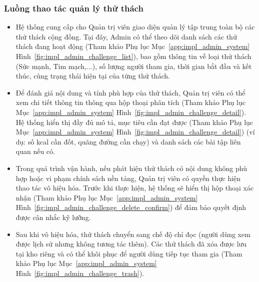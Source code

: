 \subsubsection{Luồng thao tác quản lý thử thách}
\begin{itemize}
    \item Hệ thống cung cấp cho Quản trị viên giao diện quản lý tập trung toàn bộ các thử thách cộng đồng. Tại đây, Admin có thể theo dõi danh sách các thử thách đang hoạt động (Tham khảo Phụ lục Mục~\ref{app:impl_admin_system} Hình~\ref{fig:impl_admin_challenge_list}), bao gồm thông tin về loại thử thách (Sức mạnh, Tim mạch,...), số lượng người tham gia, thời gian bắt đầu và kết thúc, cùng trạng thái hiện tại của từng thử thách.


    \item Để đánh giá nội dung và tính phù hợp của thử thách, Quản trị viên có thể xem chi tiết thông tin thông qua hộp thoại phân tích (Tham khảo Phụ lục Mục~\ref{app:impl_admin_system} Hình~\ref{fig:impl_admin_challenge_detail}). Hệ thống hiển thị đầy đủ mô tả, mục tiêu cần đạt được (Tham khảo Phụ lục Mục~\ref{app:impl_admin_system} Hình~\ref{fig:impl_admin_challenge_detail}) (ví dụ: số kcal cần đốt, quãng đường cần chạy) và danh sách các bài tập liên quan nếu có.


    \item Trong quá trình vận hành, nếu phát hiện thử thách có nội dung không phù hợp hoặc vi phạm chính sách nền tảng, Quản trị viên có quyền thực hiện thao tác vô hiệu hóa. Trước khi thực hiện, hệ thống sẽ hiển thị hộp thoại xác nhận (Tham khảo Phụ lục Mục~\ref{app:impl_admin_system} Hình~\ref{fig:impl_admin_challenge_delete_confirm}) để đảm bảo quyết định được cân nhắc kỹ lưỡng.


    \item Sau khi vô hiệu hóa, thử thách chuyển sang chế độ chỉ đọc (người dùng xem được lịch sử nhưng không tương tác thêm). Các thử thách đã xóa được lưu tại kho riêng và có thể khôi phục để người dùng tiếp tục tham gia (Tham khảo Phụ lục Mục~\ref{app:impl_admin_system} Hình~\ref{fig:impl_admin_challenge_trash}).

\end{itemize}

